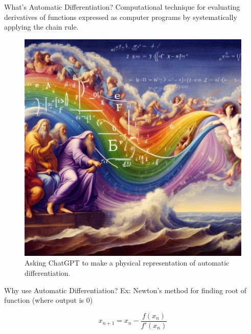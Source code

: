 \documentclass[dvipsnames]{beamer}
\begin{document}
\begin{frame}{What's Automatic Differentiation?}
 Computational technique for evaluating derivatives of functions expressed as computer programs by systematically applying the chain rule.
\begin{figure}
\centerline{\includegraphics[scale=.15]{img/image.png}}
\caption{Asking ChatGPT to make a physical representation of automatic differentiation.}
\label{fig-delulu}
\end{figure}
\vspace{-7mm}
\end{frame}

\begin{frame}{Why use Automatic Differentiation?}
Ex: Newton's method for finding root of function (where output is 0)

\begin{equation*}
    x_{n+1} = x_n - \frac{f\left(x_n\right)}{f'\left(x_{n}\right)}
\end{equation*}

\end{frame}

\end{document}
